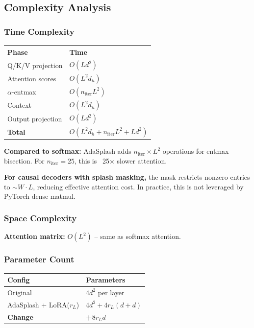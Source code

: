 \subsection{Complexity Analysis}

\subsubsection{Time Complexity}

\begin{table}[H]
\centering
\small
\begin{tabular}{ll}
\toprule
\textbf{Phase} & \textbf{Time} \\
\midrule
Q/K/V projection & $O(L d^2)$ \\
Attention scores & $O(L^2 d_h)$ \\
$\alpha$-entmax & $O(n_\text{iter} L^2)$ \\
Context & $O(L^2 d_h)$ \\
Output projection & $O(L d^2)$ \\
\textbf{Total} & $O(L^2 d_h + n_\text{iter} L^2 + L d^2)$ \\
\bottomrule
\end{tabular}
\end{table}

\textbf{Compared to softmax:} AdaSplash adds $n_\text{iter} \times L^2$ operations 
for entmax bisection. For $n_\text{iter} = 25$, this is ~25$\times$ 
slower attention.

\textbf{For causal decoders with splash masking,} the mask restricts nonzero 
entries to $\sim W \cdot L$, reducing effective attention cost. In practice, 
this is not leveraged by PyTorch dense matmul.

\subsubsection{Space Complexity}

\textbf{Attention matrix:} $O(L^2)$ -- same as softmax attention.

\subsubsection{Parameter Count}

\begin{table}[H]
\centering
\small
\begin{tabular}{ll}
\toprule
\textbf{Config} & \textbf{Parameters} \\
\midrule
Original & $4 d^2$ per layer \\
AdaSplash + LoRA($r_L$) & $4 d^2 + 4 r_L (d + d)$ \\
\textbf{Change} & \textbf{+$8 r_L d$} \\
\bottomrule
\end{tabular}
\end{table}

